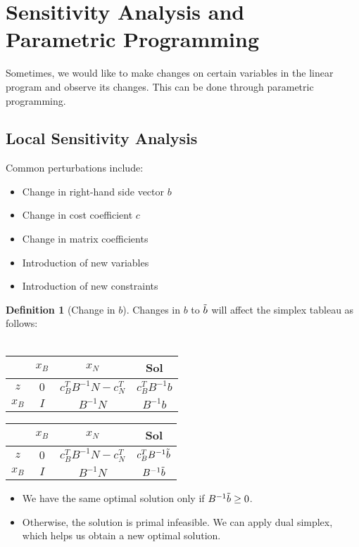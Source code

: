 \documentclass{article}
\theoremstyle{definition}
\newtheorem{definition}{Definition}[section]
\begin{document}
	\break
	\section{Sensitivity Analysis and Parametric Programming}
	Sometimes, we would like to make changes on certain variables in the linear program and observe its changes. This can be done through parametric programming.
	
	\subsection{Local Sensitivity Analysis}
	Common perturbations include:
	\begin{itemize}
	    \item Change in right-hand side vector $b$
	    \item Change in cost coefficient $c$
	    \item Change in matrix coefficients
	    \item Introduction of new variables
	    \item Introduction of new constraints
	\end{itemize}
	
	\begin{definition} [Change in $b$] \hfill \break
	    Changes in $b$ to $\Tilde{b}$ will affect the simplex tableau as follows:\\\\
    	\begin{minipage}{.5\linewidth}
          \centering
    		\begin{tabular}{ | c | c | c | c | } 
    			\hline
    			& $x_B$ & $x_N$ & Sol \\
    			\hline
    			$z$ & $0$ & $c_B^TB^{-1}N-c_N^T$ & $c_B^TB^{-1}b$ \\
    			\hline
    			$x_B$ & $I$ & $B^{-1}N$ & $B^{-1}b$ \\
    			\hline
    		\end{tabular}
        \end{minipage}
        \begin{minipage}{.5\linewidth}
          \centering
    		\begin{tabular}{ | c | c | c | c | } 
    			\hline
    			& $x_B$ & $x_N$ & Sol \\
    			\hline
    			$z$ & $0$ & $c_B^TB^{-1}N-c_N^T$ & $c_B^TB^{-1}\Tilde{b}$ \\
    			\hline
    			$x_B$ & $I$ & $B^{-1}N$ & $B^{-1}\Tilde{b}$ \\
    			\hline
    		\end{tabular}
        \end{minipage}
        \hfill
        
        \begin{itemize}
            \item We have the same optimal solution only if $B^{-1}\Tilde{b} \geq 0$.
            \item Otherwise, the solution is primal infeasible. We can apply dual simplex, which helps us obtain a new optimal solution.
        \end{itemize}
	\end{definition}
	
\end{document}
